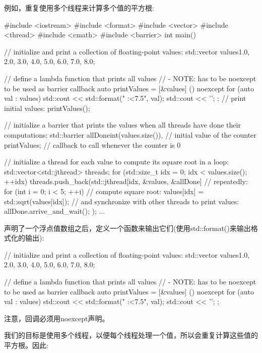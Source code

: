 例如，重复使用多个线程来计算多个值的平方根:


\begin{cpp}
#include <iostream>
#include <format>
#include <vector>
#include <thread>
#include <cmath>
#include <barrier>
int main()
{
	// initialize and print a collection of floating-point values:
	std::vector values{1.0, 2.0, 3.0, 4.0, 5.0, 6.0, 7.0, 8.0};
	
	// define a lambda function that prints all values
	// - NOTE: has to be noexcept to be used as barrier callback
	auto printValues = [&values] () noexcept{
						for (auto val : values) {
							std::cout << std::format(" {:<7.5}", val);
						}
						std::cout << '\n';
					};
	// print initial values:
	printValues();
	
	// initialize a barrier that prints the values when all threads have done their computations:
	std::barrier allDone{int(values.size()), // initial value of the counter
						 printValues}; // callback to call whenever the counter is 0
		
	// initialize a thread for each value to compute its square root in a loop:
	std::vector<std::jthread> threads;
	for (std::size_t idx = 0; idx < values.size(); ++idx) {
		threads.push_back(std::jthread{[idx, &values, &allDone] {
				// repeatedly:
				for (int i = 0; i < 5; ++i) {
					// compute square root:
					values[idx] = std::sqrt(values[idx]);
					// and synchronize with other threads to print values:
					allDone.arrive_and_wait();
				}
		}});
	}
	...
}
\end{cpp}

声明了一个浮点值数组之后，定义一个函数来输出它们(使用std::format()来输出格式化的输出):

\begin{cpp}
// initialize and print a collection of floating-point values:
std::vector values{1.0, 2.0, 3.0, 4.0, 5.0, 6.0, 7.0, 8.0};

// define a lambda function that prints all values
// - NOTE: has to be noexcept to be used as barrier callback
auto printValues = [&values] () noexcept{
	for (auto val : values) {
		std::cout << std::format(" {:<7.5}", val);
	}
	std::cout << '\n';
};
\end{cpp}

注意，回调必须用noexcept声明。

我们的目标是使用多个线程，以便每个线程处理一个值，所以会重复计算这些值的平方根。因此:

